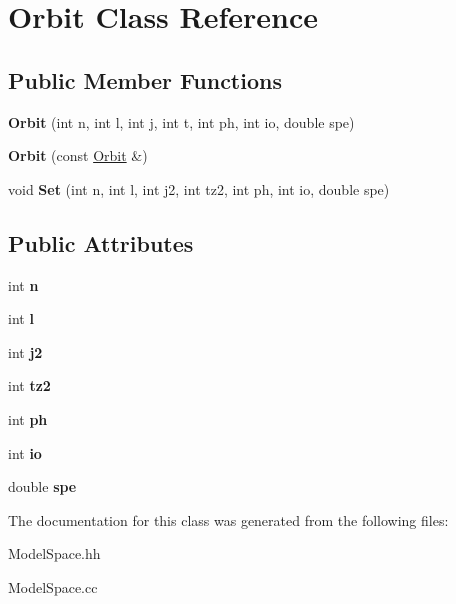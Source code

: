 \hypertarget{classOrbit}{\section{Orbit Class Reference}
\label{classOrbit}
}
\subsection*{Public Member Functions}
\begin{DoxyCompactItemize}
\item 
\hypertarget{classOrbit_a98ba429b53cb4efbb7468c6c16f1cb7e}{{\bfseries Orbit} (int n, int l, int j, int t, int ph, int io, double spe)}\label{classOrbit_a98ba429b53cb4efbb7468c6c16f1cb7e}

\item 
\hypertarget{classOrbit_acc12b8fdfccd5dc2aacbf06baa7a9d03}{{\bfseries Orbit} (const \hyperlink{classOrbit}{Orbit} \&)}\label{classOrbit_acc12b8fdfccd5dc2aacbf06baa7a9d03}

\item 
\hypertarget{classOrbit_a014860cec0609f01decf083eba7033b0}{void {\bfseries Set} (int n, int l, int j2, int tz2, int ph, int io, double spe)}\label{classOrbit_a014860cec0609f01decf083eba7033b0}

\end{DoxyCompactItemize}
\subsection*{Public Attributes}
\begin{DoxyCompactItemize}
\item 
\hypertarget{classOrbit_a61c756b2fd626b9222fea5a2b4622eca}{int {\bfseries n}}\label{classOrbit_a61c756b2fd626b9222fea5a2b4622eca}

\item 
\hypertarget{classOrbit_a3b03c063df7856524db81274331d0e4b}{int {\bfseries l}}\label{classOrbit_a3b03c063df7856524db81274331d0e4b}

\item 
\hypertarget{classOrbit_a039f1fb20d41a2227bb61c2078e67d8b}{int {\bfseries j2}}\label{classOrbit_a039f1fb20d41a2227bb61c2078e67d8b}

\item 
\hypertarget{classOrbit_a9f9a4be881aa8b960b43fb3171617816}{int {\bfseries tz2}}\label{classOrbit_a9f9a4be881aa8b960b43fb3171617816}

\item 
\hypertarget{classOrbit_ad7624269be701b6b21555321818022d8}{int {\bfseries ph}}\label{classOrbit_ad7624269be701b6b21555321818022d8}

\item 
\hypertarget{classOrbit_ad0158269c44e38113a3da3ce0b94e638}{int {\bfseries io}}\label{classOrbit_ad0158269c44e38113a3da3ce0b94e638}

\item 
\hypertarget{classOrbit_a1326ee5ea25114e1ec1f4071168e71d5}{double {\bfseries spe}}\label{classOrbit_a1326ee5ea25114e1ec1f4071168e71d5}

\end{DoxyCompactItemize}


The documentation for this class was generated from the following files\-:\begin{DoxyCompactItemize}
\item 
Model\-Space.\-hh\item 
Model\-Space.\-cc\end{DoxyCompactItemize}
